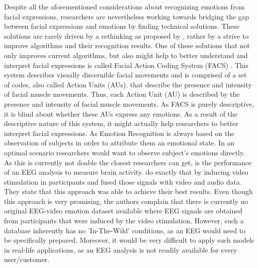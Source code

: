 Despite all the aforementioned considerations about recognizing emotions from facial expressions, researchers are nevertheless working towards bridging the gap between facial expressions and emotions by finding technical solutions. These solutions are rarely driven by a rethinking as proposed by \citet{Barrett:2019:EmotionalFromFacialMovements}, rather by a strive to improve algorithms and their recognition results. One of these solutions that not only improves current algorithms, but also might help to better understand and interpret facial expressions is called Facial Action Coding System (FACS) \citep{Ekman:2002:FACS}. This system describes visually discernible facial movements and is comprised of a set of codes, also called Action Units (AUs). that describe the presence and intensity of facial muscle movements. Thus, each Action Unit (AU) is described by the presence and intensity of facial muscle movements. As FACS is purely descriptive, it is blind about whether these AUs express any emotions. As a result of the descriptive nature of this system, it might actually help researchers to better interpret facial expressions.
\newline\newline
As Emotion Recognition is always based on the observation of subjects in order to attribute them an emotional state. In an optimal scenario researchers would want to observe subject's emotions directly. As this is currently not doable the closest researchers can get, is the performance of an EEG analysis to measure brain activity. \citet{Xing:2019:EEGAudioVisual} do exactly that by inducing video stimulation in participants and fused those signals with video and audio data. They state that this approach was able to achieve their best results.
\newline
Even though this approach is very promising, the authors complain that there is currently no original EEG-video emotion dataset available where EEG signals are obtained from participants that were induced by the video stimulation. However, such a database inherently has no 'In-The-Wild' conditions, as an EEG would need to be specifically prepared. Moreover, it would be very difficult to apply such models in real-life applications, as an EEG analysis is not readily available for every user/customer.
